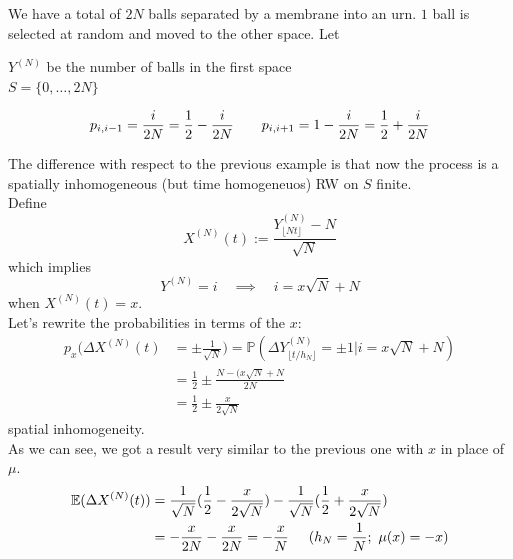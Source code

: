 \documentclass{article}
\begin{document}
\begin{enumerate}
\begin{minipage}{0.5\textwidth}
		We have a total of $2N$ balls separated by a membrane into an urn. $1$ ball is selected at random and moved to the other space. Let 
		\begin{center}
			$Y^{(N)}$ be the number of balls in the first space \\
			$S=\{0, \ldots, 2N\}$
		\end{center}
		\begin{equation*}
			p_{i, i-1}= \frac{i}{2N} = \frac{1}{2}- \frac{i}{2N} \hspace{0.7 cm} p_{i, i+1}= 1 - \frac{i}{2N}= \frac{1}{2}+ \frac{i}{2N}
		\end{equation*}
	\end{minipage}
	\begin{minipage}{0.4\textwidth}
		\begin{figure}[H]
			\hfill
			
		\end{figure}
	\end{minipage}\par
	The difference with respect to the previous example is that now the process is a spatially inhomogeneous (but time homogeneuos) RW on $S$ finite. \\
	Define 
	\begin{equation*}
		X^{(N)}(t):= \frac{Y^{(N)}_{\lfloor Nt \rfloor} - N}{\sqrt{N}}
	\end{equation*}
	which implies 
	\begin{equation*}
		Y^{(N)}= i \quad \implies \quad i=x \sqrt{N}+ N
	\end{equation*}
	when $X^{(N)}(t) = x$.\\
	Let's rewrite the probabilities in terms of the $x$:
	\begin{align*}
		p_{x} (\Delta X^{(N)}(t) &= \pm \frac{1}{\sqrt{N}})= \mathbb{P}(\Delta Y^{(N)}_{\lfloor t/h_N \rfloor}= \pm 1| i = x\sqrt{N}+N)   \\
		&= \frac{1}{2} \pm \frac{N - (x \sqrt{N} + N}{2 N} \\
		&= \frac{1}{2} \pm\frac{x}{2 \sqrt{N}}
	\end{align*}
	spatial inhomogeneity. \\
	As we can see, we got a result very similar to the previous one with $x$ in place of $\mu$. \\
	\begin{align*}
		\mathbb{E}(\Delta X^{(N)}(t)) &= \frac{1}{\sqrt{N}}(\frac{1}{2} - \frac{x}{2 \sqrt{N}}) - \frac{1}{\sqrt{N}}(\frac{1}{2} + \frac{x}{2 \sqrt{N}}) \\
		&= - \frac{x}{2N} - \frac{x}{2N} = -\frac{x}{N} \hspace{ 0.5 cm} (h_N = \frac{1}{N};  \ \mu (x) = -x)

\end{align*}
\end{enumerate}
\end{document}
